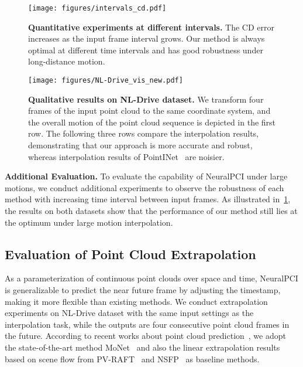 \documentclass[10pt,twocolumn,letterpaper]{article}
\begin{document}
\begin{figure}[t]
\centering
  \texttt{[image: figures/intervals\_cd.pdf]}
  \caption{\textbf{Quantitative experiments at different intervals.} The CD error increases as the input frame interval grows. Our method is always optimal at different time intervals and has good robustness under long-distance motion.}
  \label{fig:intervals}
\vspace{-.4cm}
\end{figure}  


\begin{figure*}[t]
\centering
  \texttt{[image: figures/NL-Drive\_vis\_new.pdf]}
  \caption{\textbf{Qualitative results on NL-Drive dataset.} We transform four frames of the input point cloud to the same coordinate system, and the overall motion of the point cloud sequence is depicted in the first row. The following three rows compare the interpolation results, demonstrating that our approach is more accurate and robust, whereas interpolation results of PointINet~\cite{lu2021pointinet} are noisier.}
  \label{fig:NL_vis}
\vspace{-.4cm}
\end{figure*}  



\textbf{Additional Evaluation. }To evaluate the capability of NeuralPCI under large motions, we conduct additional experiments to observe the robustness of each method with increasing time interval between input frames. As illustrated in~\cref{fig:intervals}, the results on both datasets show that the performance of our method still lies at the optimum under large motion interpolation.




\subsection{Evaluation of Point Cloud Extrapolation}
As a parameterization of continuous point clouds over space and time, NeuralPCI is generalizable to predict the near future frame by adjusting the timestamp, making it more flexible than existing methods. We conduct extrapolation experiments on NL-Drive dataset with the same input settings as the interpolation task, while the outputs are four consecutive point cloud frames in the future. According to recent works about point cloud prediction~\cite{weng2021inverting,mersch2022self,weng2022s2net,lu2021monet}, we adopt the state-of-the-art method MoNet~\cite{lu2021monet} and also the linear extrapolation results based on scene flow from PV-RAFT~\cite{wei2021pv} and NSFP~\cite{li2021neuralSF} as baseline methods. 
\end{document}
